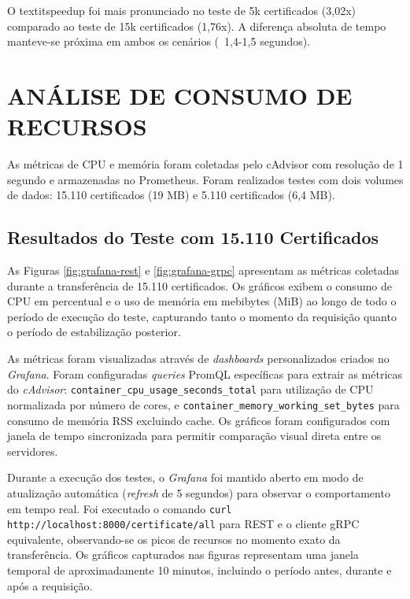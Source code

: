 O textit{speedup} foi mais pronunciado no teste de 5k certificados (3,02x) comparado ao teste de 15k certificados (1,76x). A diferença absoluta de tempo manteve-se próxima em ambos os cenários (~1,4-1,5 segundos).

\section{ANÁLISE DE CONSUMO DE RECURSOS}\label{sec:consumo-recursos}

As métricas de CPU e memória foram coletadas pelo cAdvisor com resolução de 1 segundo e armazenadas no Prometheus. Foram realizados testes com dois volumes de dados: 15.110 certificados (19 MB) e 5.110 certificados (6,4 MB).

\subsection{Resultados do Teste com 15.110 Certificados}

As Figuras \ref{fig:grafana-rest} e \ref{fig:grafana-grpc} apresentam as métricas coletadas durante a transferência de 15.110 certificados. Os gráficos exibem o consumo de CPU em percentual e o uso de memória em mebibytes (MiB) ao longo de todo o período de execução do teste, capturando tanto o momento da requisição quanto o período de estabilização posterior.

As métricas foram visualizadas através de \textit{dashboards} personalizados criados no \textit{Grafana}. Foram configuradas \textit{queries} PromQL específicas para extrair as métricas do \textit{cAdvisor}: \texttt{container\_cpu\_usage\_seconds\_total} para utilização de CPU normalizada por número de cores, e \texttt{container\_memory\_working\_set\_bytes} para consumo de memória RSS excluindo cache. Os gráficos foram configurados com janela de tempo sincronizada para permitir comparação visual direta entre os servidores.

Durante a execução dos testes, o \textit{Grafana} foi mantido aberto em modo de atualização automática (\textit{refresh} de 5 segundos) para observar o comportamento em tempo real. Foi executado o comando \texttt{curl http://localhost:8000/certificate/all} para REST e o cliente gRPC equivalente, observando-se os picos de recursos no momento exato da transferência. Os gráficos capturados nas figuras representam uma janela temporal de aproximadamente 10 minutos, incluindo o período antes, durante e após a requisição.

